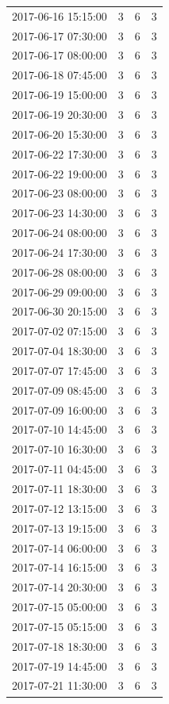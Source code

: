 \begin{tabular}{lrrr}
2017-06-16 15:15:00 & 3 & 6 & 3 \\
2017-06-17 07:30:00 & 3 & 6 & 3 \\
2017-06-17 08:00:00 & 3 & 6 & 3 \\
2017-06-18 07:45:00 & 3 & 6 & 3 \\
2017-06-19 15:00:00 & 3 & 6 & 3 \\
2017-06-19 20:30:00 & 3 & 6 & 3 \\
2017-06-20 15:30:00 & 3 & 6 & 3 \\
2017-06-22 17:30:00 & 3 & 6 & 3 \\
2017-06-22 19:00:00 & 3 & 6 & 3 \\
2017-06-23 08:00:00 & 3 & 6 & 3 \\
2017-06-23 14:30:00 & 3 & 6 & 3 \\
2017-06-24 08:00:00 & 3 & 6 & 3 \\
2017-06-24 17:30:00 & 3 & 6 & 3 \\
2017-06-28 08:00:00 & 3 & 6 & 3 \\
2017-06-29 09:00:00 & 3 & 6 & 3 \\
2017-06-30 20:15:00 & 3 & 6 & 3 \\
2017-07-02 07:15:00 & 3 & 6 & 3 \\
2017-07-04 18:30:00 & 3 & 6 & 3 \\
2017-07-07 17:45:00 & 3 & 6 & 3 \\
2017-07-09 08:45:00 & 3 & 6 & 3 \\
2017-07-09 16:00:00 & 3 & 6 & 3 \\
2017-07-10 14:45:00 & 3 & 6 & 3 \\
2017-07-10 16:30:00 & 3 & 6 & 3 \\
2017-07-11 04:45:00 & 3 & 6 & 3 \\
2017-07-11 18:30:00 & 3 & 6 & 3 \\
2017-07-12 13:15:00 & 3 & 6 & 3 \\
2017-07-13 19:15:00 & 3 & 6 & 3 \\
2017-07-14 06:00:00 & 3 & 6 & 3 \\
2017-07-14 16:15:00 & 3 & 6 & 3 \\
2017-07-14 20:30:00 & 3 & 6 & 3 \\
2017-07-15 05:00:00 & 3 & 6 & 3 \\
2017-07-15 05:15:00 & 3 & 6 & 3 \\
2017-07-18 18:30:00 & 3 & 6 & 3 \\
2017-07-19 14:45:00 & 3 & 6 & 3 \\
2017-07-21 11:30:00 & 3 & 6 & 3 \\

\end{tabular}
